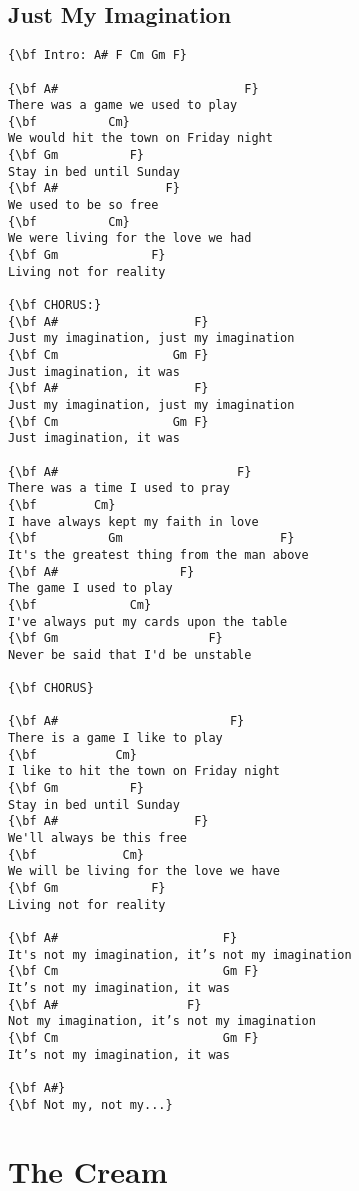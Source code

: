 \documentclass[a4paper]{article}
\begin{document}
\subsection{Just My Imagination} %
\label{sub:subsection name}
\begin{multicols}{2}
\begin{Verbatim}[commandchars=\\\{\}]
{\bf Intro: A# F Cm Gm F}

{\bf A#                          F}
There was a game we used to play
{\bf          Cm}
We would hit the town on Friday night
{\bf Gm          F}
Stay in bed until Sunday
{\bf A#               F}
We used to be so free
{\bf          Cm}
We were living for the love we had
{\bf Gm             F}
Living not for reality

{\bf CHORUS:}
{\bf A#                   F}
Just my imagination, just my imagination
{\bf Cm                Gm F}
Just imagination, it was
{\bf A#                   F}
Just my imagination, just my imagination
{\bf Cm                Gm F}
Just imagination, it was

{\bf A#                         F}
There was a time I used to pray
{\bf        Cm}
I have always kept my faith in love
{\bf          Gm                      F}
It's the greatest thing from the man above
{\bf A#                 F}
The game I used to play
{\bf             Cm}
I've always put my cards upon the table
{\bf Gm                     F}
Never be said that I'd be unstable

{\bf CHORUS}

{\bf A#                        F}
There is a game I like to play
{\bf           Cm}
I like to hit the town on Friday night
{\bf Gm          F}
Stay in bed until Sunday
{\bf A#                   F}
We'll always be this free
{\bf            Cm}
We will be living for the love we have
{\bf Gm             F}
Living not for reality

{\bf A#                       F}
It's not my imagination, it’s not my imagination
{\bf Cm                       Gm F}
It’s not my imagination, it was
{\bf A#                  F}
Not my imagination, it’s not my imagination
{\bf Cm                       Gm F}
It’s not my imagination, it was

{\bf A#}
{\bf Not my, not my...}
\end{Verbatim}
\end{multicols}
\newpage
\section{The Cream} %
\label{sec:The Cream}
\end{document}
